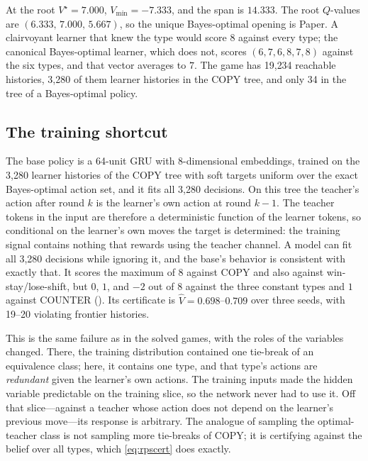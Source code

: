 \documentclass[conference]{IEEEtran}
\begin{document}
At the root $V^{\star}=7.000$, $V_{\min}=-7.333$, and the span is $14.333$. The root $Q$-values are $(6.333,\,7.000,\,5.667)$, so the unique Bayes-optimal opening is Paper. A clairvoyant learner that knew the type would score $8$ against every type; the canonical Bayes-optimal learner, which does not, scores $(6,7,6,8,7,8)$ against the six types, and that vector averages to $7$. The game has 19{,}234 reachable histories, 3{,}280 of them learner histories in the COPY tree, and only 34 in the tree of a Bayes-optimal policy.

\subsection{The training shortcut}
The base policy is a 64-unit GRU with 8-dimensional embeddings, trained on the 3{,}280 learner histories of the COPY tree with soft targets uniform over the exact Bayes-optimal action set, and it fits all 3{,}280 decisions. On this tree the teacher's action after round $k$ is the learner's own action at round $k-1$. The teacher tokens in the input are therefore a deterministic function of the learner tokens, so conditional on the learner's own moves the target is determined: the training signal contains nothing that rewards using the teacher channel. A model can fit all 3{,}280 decisions while ignoring it, and the base's behavior is consistent with exactly that. It scores the maximum of $8$ against COPY and also against win-stay/lose-shift, but $0$, $1$, and $-2$ out of $8$ against the three constant types and $1$ against COUNTER (). Its certificate is $\hat V=0.698$--$0.709$ over three seeds, with 19--20 violating frontier histories.

This is the same failure as in the solved games, with the roles of the variables changed. There, the training distribution contained one tie-break of an equivalence class; here, it contains one type, and that type's actions are \emph{redundant} given the learner's own actions. The training inputs made the hidden variable predictable on the training slice, so the network never had to use it. Off that slice---against a teacher whose action does not depend on the learner's previous move---its response is arbitrary. The analogue of sampling the optimal-teacher class is not sampling more tie-breaks of COPY; it is certifying against the belief over all types, which \eqref{eq:rpscert} does exactly.
\end{document}
